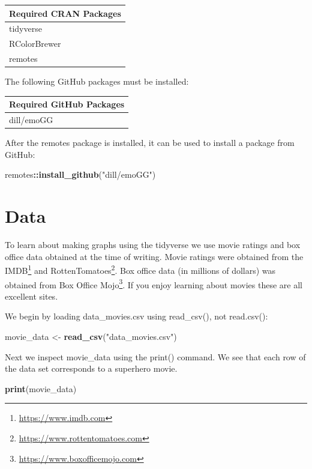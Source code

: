 \documentclass[
]{krantz}
\makeatletter
\newenvironment{Shaded}{\begin{snugshade}}{\end{snugshade}}
\newcommand{\KeywordTok}[1]{\textcolor[rgb]{0.27,0.27,0.27}{\textbf{#1}}}
\newcommand{\NormalTok}[1]{#1}
\newcommand{\OperatorTok}[1]{\textcolor[rgb]{0.43,0.43,0.43}{\textbf{#1}}}
\newcommand{\StringTok}[1]{\textcolor[rgb]{0.5,0.5,0.5}{#1}}
\renewcommand{\href}[2]{#2\footnote{\url{#1}}}
\newenvironment{kframe}{%
\medskip{}
\setlength{\fboxsep}{.8em}
 \def\at@end@of@kframe{}%
 \ifinner\ifhmode%
  \def\at@end@of@kframe{\end{minipage}}%
  \begin{minipage}{\columnwidth}%
 \fi\fi%
 \def\FrameCommand##1{\hskip\@totalleftmargin \hskip-\fboxsep
 \colorbox{shadecolor}{##1}\hskip-\fboxsep
     \hskip-\linewidth \hskip-\@totalleftmargin \hskip\columnwidth}%
 \MakeFramed {\advance\hsize-\width
   \@totalleftmargin\z@ \linewidth\hsize
   \@setminipage}}%
 {\par\unskip\endMakeFramed%
 \at@end@of@kframe}
\renewenvironment{Shaded}{\begin{kframe}}{\end{kframe}}
\makeatother
\begin{document}
\begin{longtable}[]{@{}l@{}}
\toprule
Required CRAN Packages\tabularnewline
\midrule
\endhead
tidyverse\tabularnewline
RColorBrewer\tabularnewline
remotes\tabularnewline
\bottomrule
\end{longtable}

The following GitHub packages must be installed:

\begin{longtable}[]{@{}l@{}}
\toprule
Required GitHub Packages\tabularnewline
\midrule
\endhead
dill/emoGG\tabularnewline
\bottomrule
\end{longtable}

After the remotes package is installed, it can be used to install a package from GitHub:

\begin{Shaded}
\begin{Highlighting}[]
\NormalTok{remotes}\OperatorTok{::}\KeywordTok{install_github}\NormalTok{(}\StringTok{"dill/emoGG"}\NormalTok{)}
\end{Highlighting}
\end{Shaded}

\hypertarget{data}{%
\section{Data}\label{data}}

To learn about making graphs using the tidyverse we use movie ratings and box office data obtained at the time of writing. Movie ratings were obtained from the \href{https://www.imdb.com}{IMDB} and \href{https://www.rottentomatoes.com}{RottenTomatoes}. Box office data (in millions of dollars) was obtained from \href{https://www.boxofficemojo.com}{Box Office Mojo}. If you enjoy learning about movies these are all excellent sites.

We begin by loading data\_movies.csv using read\_csv(), not read.csv():

\begin{Shaded}
\begin{Highlighting}[]
\NormalTok{movie_data <-}\StringTok{ }\KeywordTok{read_csv}\NormalTok{(}\StringTok{"data_movies.csv"}\NormalTok{)}
\end{Highlighting}
\end{Shaded}

Next we inspect movie\_data using the print() command. We see that each row of the data set corresponds to a superhero movie.

\begin{Shaded}
\begin{Highlighting}[]
\KeywordTok{print}\NormalTok{(movie_data)}
\end{Highlighting}
\end{Shaded}
\end{document}
